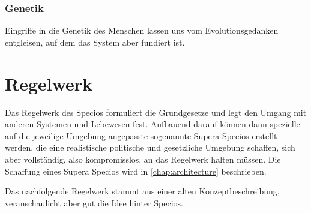 \subsubsection{Genetik}

Eingriffe in die Genetik des Menschen lassen uns vom Evolutionsgedanken entgleisen, auf dem das System aber fundiert ist.

\section{Regelwerk}\label{sec:rulebook}

Das Regelwerk des Specios formuliert die Grundgesetze und legt den Umgang mit anderen Systemen und Lebewesen fest. Aufbauend darauf können dann spezielle auf die jeweilige Umgebung angepasste sogenannte Supera Specios erstellt werden, die eine realistische politische und gesetzliche Umgebung schaffen, sich aber vollständig, also kompromisslos, an das Regelwerk halten müssen. Die Schaffung eines Supera Specios wird in \vref{chap:architecture} beschrieben.

Das nachfolgende Regelwerk stammt aus einer alten Konzeptbeschreibung, veranschaulicht aber gut die Idee hinter Specios.

